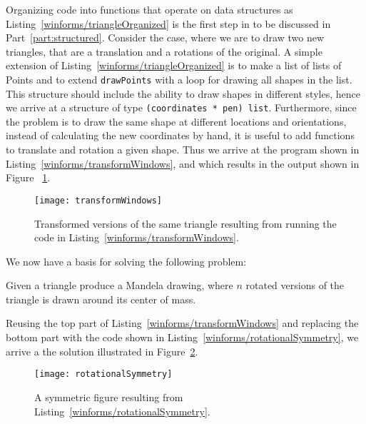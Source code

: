 Organizing code into functions that operate on data structures as Listing~\ref{winforms/triangleOrganized} is the first step in  to be discussed in Part~\ref{part:structured}. Consider the case, where we are to draw two new triangles, that are a translation and a rotations of the original. A simple extension of Listing~\ref{winforms/triangleOrganized} is to make a list of lists of Points and to extend \lstinline!drawPoints! with a loop for drawing all shapes in the list. This structure should include the ability to draw shapes in different styles, hence we arrive at a structure of type \lstinline!(coordinates * pen) list!. Furthermore, since the problem is to draw the same shape at different locations and orientations, instead of calculating the new coordinates by hand, it is useful to add functions to translate and rotation a given shape. Thus we arrive at the program shown in Listing~\ref{winforms/transformWindows}, and which results in the output shown in
Figure~ \ref{fig:transformWindow}.
%
%
\begin{figure}
  \centering
  \texttt{[image: transformWindows]}
  \caption{Transformed versions of the same triangle resulting from running the code in Listing~\ref{winforms/transformWindows}.}
  \label{fig:transformWindow}
\end{figure}
We now have a basis for solving the following problem:
\begin{problem}
  Given a triangle produce a Mandela drawing, where $n$ rotated versions of the triangle is drawn around its center of mass.
\end{problem}
Reusing the top part of Listing~\ref{winforms/transformWindows} and replacing the bottom part with the code shown in Listing~\ref{winforms/rotationalSymmetry}, we arrive a the solution illustrated in Figure~\ref{fig:rotationalSymmetry}.
%
%
\begin{figure}
  \centering
  \texttt{[image: rotationalSymmetry]}
  \caption{A symmetric figure resulting from Listing~\ref{winforms/rotationalSymmetry}.}
  \label{fig:rotationalSymmetry}
\end{figure}

